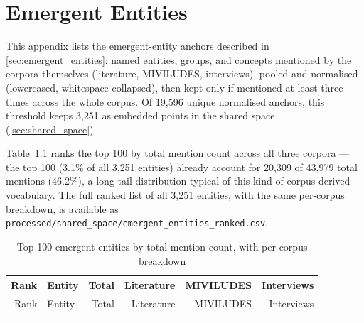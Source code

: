\chapter{Emergent Entities}\label{ch:emergent_entities}

This appendix lists the emergent-entity anchors described in \ref{sec:emergent_entities}: named entities, groups, and concepts mentioned by the corpora themselves (literature, MIVILUDES, interviews), pooled and normalised (lowercased, whitespace-collapsed), then kept only if mentioned at least three times across the whole corpus. Of 19{,}596 unique normalised anchors, this threshold keeps 3{,}251 as embedded points in the shared space (\ref{sec:shared_space}).

Table~\ref{tab:emergent_entities} ranks the top 100 by total mention count across all three corpora — the top 100 (3.1\% of all 3{,}251 entities) already account for 20{,}309 of 43{,}979 total mentions (46.2\%), a long-tail distribution typical of this kind of corpus-derived vocabulary. The full ranked list of all 3{,}251 entities, with the same per-corpus breakdown, is available as \texttt{processed/shared\_space/emergent\_entities\_ranked.csv}.

\begin{longtable}{@{}r p{5.5cm} r r r r@{}}
\caption{Top 100 emergent entities by total mention count, with per-corpus breakdown}\label{tab:emergent_entities} \\
\toprule
Rank & Entity & Total & Literature & MIVILUDES & Interviews \\
\midrule
\endfirsthead
\toprule
Rank & Entity & Total & Literature & MIVILUDES & Interviews \\
\midrule
\endhead
\bottomrule
\endfoot

\end{longtable}

